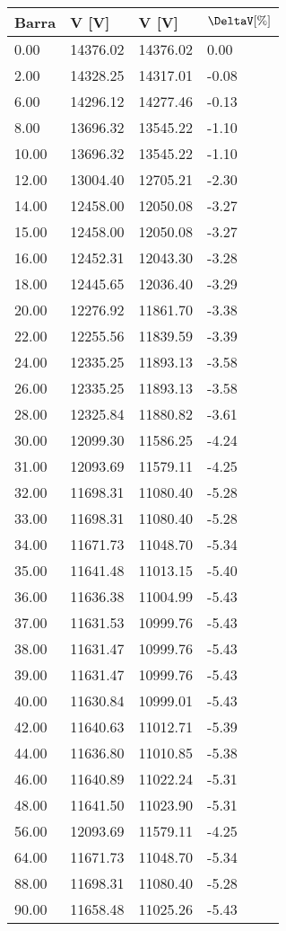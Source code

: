 \begin{tabular}{llll}
\toprule
\textbf{Barra}&\textbf{V [V]}&\textbf{V [V]}&\textbf{$\mathbf{\DeltaV [\%]}$}\\
\midrule
0.00&14376.02&14376.02&0.00\\
2.00&14328.25&14317.01&-0.08\\
6.00&14296.12&14277.46&-0.13\\
8.00&13696.32&13545.22&-1.10\\
10.00&13696.32&13545.22&-1.10\\
12.00&13004.40&12705.21&-2.30\\
14.00&12458.00&12050.08&-3.27\\
15.00&12458.00&12050.08&-3.27\\
16.00&12452.31&12043.30&-3.28\\
18.00&12445.65&12036.40&-3.29\\
20.00&12276.92&11861.70&-3.38\\
22.00&12255.56&11839.59&-3.39\\
24.00&12335.25&11893.13&-3.58\\
26.00&12335.25&11893.13&-3.58\\
28.00&12325.84&11880.82&-3.61\\
30.00&12099.30&11586.25&-4.24\\
31.00&12093.69&11579.11&-4.25\\
32.00&11698.31&11080.40&-5.28\\
33.00&11698.31&11080.40&-5.28\\
34.00&11671.73&11048.70&-5.34\\
35.00&11641.48&11013.15&-5.40\\
36.00&11636.38&11004.99&-5.43\\
37.00&11631.53&10999.76&-5.43\\
38.00&11631.47&10999.76&-5.43\\
39.00&11631.47&10999.76&-5.43\\
40.00&11630.84&10999.01&-5.43\\
42.00&11640.63&11012.71&-5.39\\
44.00&11636.80&11010.85&-5.38\\
46.00&11640.89&11022.24&-5.31\\
48.00&11641.50&11023.90&-5.31\\
56.00&12093.69&11579.11&-4.25\\
64.00&11671.73&11048.70&-5.34\\
88.00&11698.31&11080.40&-5.28\\
90.00&11658.48&11025.26&-5.43\\
\bottomrule
\end{tabular}
